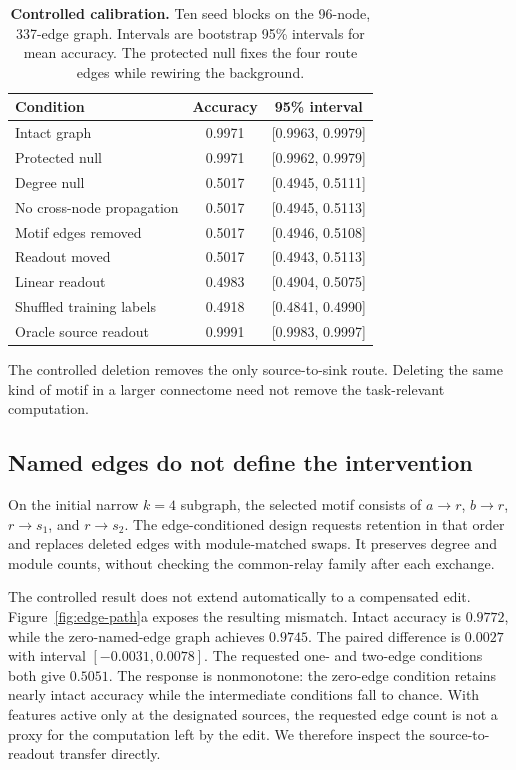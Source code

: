 \begin{table}[t]
\centering
\caption{\textbf{Controlled calibration.} Ten seed blocks on the
96-node, 337-edge graph. Intervals are bootstrap 95\% intervals for mean
accuracy. The protected null fixes the four route edges while rewiring
the background.}
\label{tab:calibration}
\small
\begin{tabular}{lcc}
\toprule
Condition & Accuracy & 95\% interval \\
\midrule
Intact graph & 0.9971 & [0.9963, 0.9979] \\
Protected null & 0.9971 & [0.9962, 0.9979] \\
Degree null & 0.5017 & [0.4945, 0.5111] \\
No cross-node propagation & 0.5017 & [0.4945, 0.5113] \\
Motif edges removed & 0.5017 & [0.4946, 0.5108] \\
Readout moved & 0.5017 & [0.4943, 0.5113] \\
Linear readout & 0.4983 & [0.4904, 0.5075] \\
Shuffled training labels & 0.4918 & [0.4841, 0.4990] \\
Oracle source readout & 0.9991 & [0.9983, 0.9997] \\
\bottomrule
\end{tabular}
\end{table}

The controlled deletion removes the only source-to-sink route. Deleting
the same kind of motif in a larger connectome need not remove the
task-relevant computation.

\subsection{Named edges do not define the intervention}
\label{sec:edge}

On the initial narrow $k=4$ subgraph, the selected motif consists of
$a\!\to\!r$, $b\!\to\!r$, $r\!\to\!s_1$, and
$r\!\to\!s_2$. The edge-conditioned design requests retention in that
order and replaces deleted edges with module-matched swaps. It preserves
degree and module counts, without checking the common-relay family after
each exchange.

The controlled result does not extend automatically to a compensated edit.
Figure~\ref{fig:edge-path}a exposes the resulting mismatch. Intact accuracy
is $0.9772$, while the zero-named-edge graph achieves $0.9745$.
The paired difference is $0.0027$ with interval $[-0.0031,0.0078]$.
The requested one- and two-edge conditions both give $0.5051$.
The response is nonmonotone: the zero-edge condition retains nearly
intact accuracy while the intermediate conditions fall to chance. With
features active only at the designated sources, the requested edge count
is not a proxy for the computation left by the edit. We therefore inspect
the source-to-readout transfer directly.

